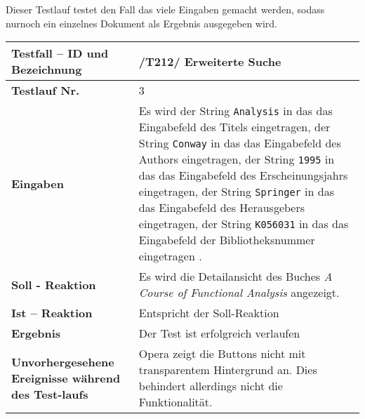 Dieser Testlauf testet den Fall das viele Eingaben gemacht werden, sodass
nurnoch ein einzelnes Dokument als Ergebnis ausgegeben wird.

\begin{longtable}{|p{5cm}|p{10cm}|}
\hline
\textbf{Testfall -- ID und Bezeichnung} & \textnormal{/T212/ Erweiterte
Suche} \\
\hline
\textbf{Testlauf Nr.} & \textnormal{3} \\
\hline
\textbf{Eingaben} & \textnormal{Es wird 
der String \lstinline{Analysis} in das das Eingabefeld des Titels eingetragen,
der String \lstinline{Conway} in das das Eingabefeld des Authors eingetragen,
der String \lstinline{1995} in das das Eingabefeld des Erscheinungsjahrs
eingetragen,
der String \lstinline{Springer} in das das Eingabefeld des Herausgebers
eingetragen,
der String \lstinline{K056031} in das das Eingabefeld der Bibliotheksnummer eingetragen
.} \\
\hline
\textbf{Soll - Reaktion} & \textnormal{Es wird die Detailansicht des Buches \textit{A
Course of Functional Analysis} angezeigt.} \\
\hline
\textbf{Ist -- Reaktion} & \textnormal{Entspricht der Soll-Reaktion} \\
\hline
\textbf{Ergebnis} & \textnormal{Der Test ist erfolgreich verlaufen} \\
\hline
\textbf{Unvorhergesehene Ereignisse w\"ahrend des Test-laufs } &
\textnormal{Opera zeigt die Buttons nicht mit transparentem Hintergrund an. Dies
behindert allerdings nicht die Funktionalität.} \\
\hline
\end{longtable}
